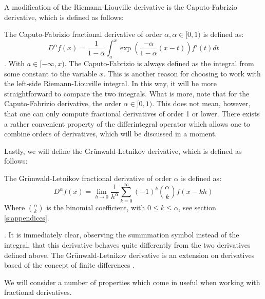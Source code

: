 A modification of the Riemann-Liouville derivative is the Caputo-Fabrizio derivative, which is defined as follows:
\begin{definition}\label{d: CF}
    The Caputo-Fabrizio fractional derivative of order \(\alpha, \alpha \in [0,1)\) is defined as:
    \begin{equation}
        D^{\alpha} f(x) = \frac{1}{1 - \alpha}  \int_{a}^{x} \exp\left(\frac{-\alpha}{1 - \alpha}(x-t)\right) f'(t) dt
    \end{equation} \cite{caputo2015}.
    With \(a \in [-\infty, x)\).
    The Caputo-Fabrizio is always defined as the integral from some constant to the variable \(x\). This is another reason for choosing to work with the left-side Riemann-Liouville integral. In this way, it will be more straightforward to compare the two integrals. What is more, note that for the Caputo-Fabrizio derivative, the order \(\alpha \in [0, 1)\). This does not mean, however, that one can only compute fractional derivatives of order 1 or lower. There exists a rather convenient property of the differintegral operator which allows one to combine orders of derivatives, which will be discussed in a moment.
    
\end{definition}

Lastly, we will define the Grünwald-Letnikov derivative, which is defined as follows:
\begin{definition}
    The Grünwald-Letnikov fractional derivative of order \(\alpha\) is defined as:
    \begin{equation}
        D^\alpha f(x) = \lim_{h \to 0} \frac{1}{h^\alpha} \sum_{k=0}^\infty (-1)^k \binom{\alpha}{k} f(x - k h)
    \end{equation}
   Where \(\binom{\alpha}{k}\) is the binomial coefficient, with \(0 \leq k \leq \alpha\), see section \autoref{s:appendices}.
\end{definition} \cite{zhmakin2022}.
It is immediately clear, observing the summmation symbol instead of the integral, that this derivative behaves quite differently from the two derivatives defined above. The Grünwald-Letnikov derivative is an extension on derivatives based of the concept of finite differences \cite{flajolet1995}.

We will consider a number of properties which come in useful when working with fractional derivatives.

